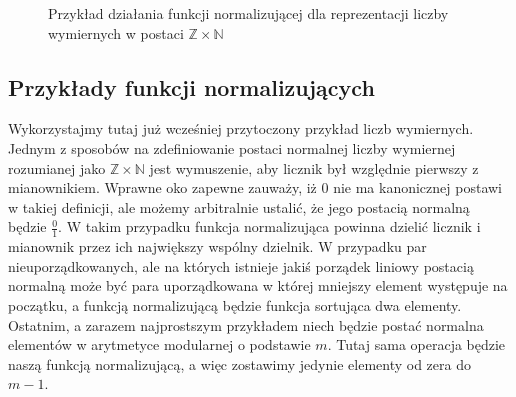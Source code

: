 \begin{figure}[!htp]
    \centering
    \caption{Przykład działania funkcji normalizującej dla reprezentacji liczby wymiernych w postaci $\mathbb{Z} \times \mathbb{N}$}
    \label{fig:normalizing_function}
\end{figure}

\subsection{Przykłady funkcji normalizujących}
Wykorzystajmy tutaj już wcześniej przytoczony przykład liczb wymiernych. Jednym z sposobów na zdefiniowanie postaci normalnej liczby wymiernej rozumianej jako $\mathbb{Z} \times \mathbb{N}$ jest wymuszenie, aby licznik był względnie pierwszy z mianownikiem. Wprawne oko zapewne zauważy, iż $0$ nie ma kanonicznej postawi w takiej definicji, ale możemy arbitralnie ustalić, że jego postacią normalną będzie $\frac{0}{1}$. W takim przypadku funkcja normalizująca powinna dzielić licznik i mianownik przez ich największy wspólny dzielnik.
W przypadku par nieuporządkowanych, ale na których istnieje jakiś porządek liniowy postacią normalną może być para uporządkowana w której mniejszy element występuje na początku, a funkcją normalizującą będzie funkcja sortująca dwa elementy. Ostatnim, a zarazem najprostszym przykładem niech będzie postać normalna elementów w arytmetyce modularnej o podstawie $m$. Tutaj sama operacja będzie naszą funkcją normalizującą, a więc zostawimy jedynie elementy od zera do $m-1$.   

